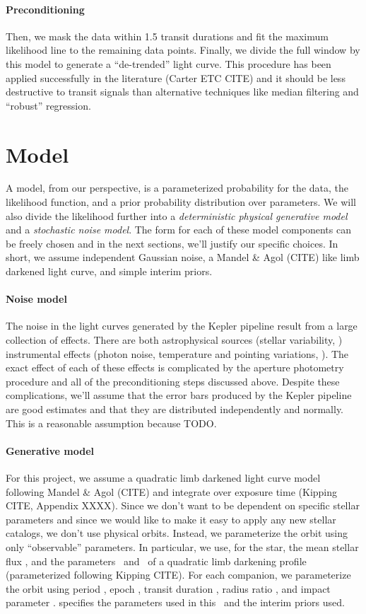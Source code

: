 \documentclass[12pt,preprint]{aastex}
\begin{document}
\paragraph{Preconditioning}
Then, we mask the data within 1.5 transit durations and fit the maximum
likelihood line to the remaining data points.
Finally, we divide the full window by this model to generate a ``de-trended''
light curve.
This procedure has been applied successfully in the literature (Carter ETC
CITE) and it should be less destructive to transit signals than alternative
techniques like median filtering and ``robust'' regression.

\section{Model}

A model, from our perspective, is a parameterized probability for the data,
the likelihood function, and a prior probability distribution over parameters.
We will also divide the likelihood further into a \emph{deterministic physical
generative model} and a \emph{stochastic noise model}.
The form for each of these model components can be freely chosen and in the
next sections, we'll justify our specific choices.
In short, we assume independent Gaussian noise, a Mandel \& Agol (CITE) like
limb darkened light curve, and simple interim priors.

\paragraph{Noise model}
The noise in the light curves generated by the Kepler pipeline result from a
large collection of effects.
There are both astrophysical sources (stellar variability, \etc) instrumental
effects (photon noise, temperature and pointing variations, \etc).
The exact effect of each of these effects is complicated by the aperture
photometry procedure and all of the preconditioning steps discussed above.
Despite these complications, we'll assume that the error bars produced by the
Kepler pipeline are good estimates and that they are distributed independently
and normally.
This is a reasonable assumption because TODO.

\paragraph{Generative model}
For this project, we assume a quadratic limb darkened light curve model
following Mandel \& Agol (CITE) and integrate over exposure time (Kipping
CITE, Appendix XXXX).
Since we don't want to be dependent on specific stellar parameters and since
we would like to make it easy to apply any new stellar catalogs, we don't use
physical orbits.
Instead, we parameterize the orbit using only ``observable'' parameters.
In particular, we use, for the star, the mean stellar flux \fstar, and the
parameters \qone\ and \qtwo\ of a quadratic limb darkening profile
(parameterized following Kipping CITE).
For each companion, we parameterize the orbit using period \period, epoch
\epoch, transit duration \duration, radius ratio \ror, and impact parameter
\impact.
 specifies the parameters used in this \paper\ and the
interim priors used.
\end{document}
